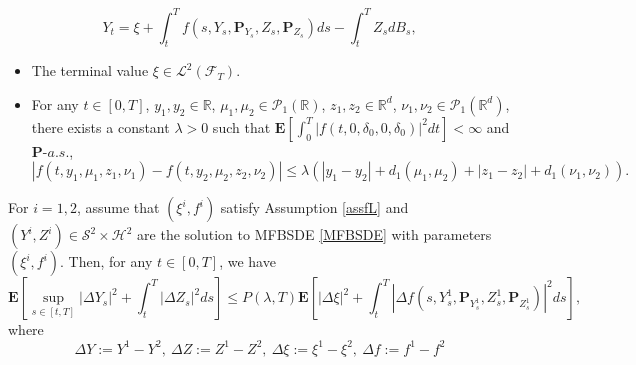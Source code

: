 \documentclass[10pt,a4paper]{amsart}
\def \E{\mathbf{E}}
\def \P{\mathbf{P}}
\begin{document}
\begin{equation}\label{MFBSDE}
Y_t=\xi+\int_t^T f(s,Y_s,\P_{Y_s},Z_s,\P_{Z_s})ds-\int_t^T Z_s dB_s,  
\end{equation}

\begin{assumption}\label{assfL}
\begin{itemize}
\item[(i)] The terminal value $\xi\in\mathcal{L}^2(\mathcal{F}_T)$.
\item[(ii)]  For any $t\in[0,T]$, $ y_1,y_2\in \mathbb{R}$, $\mu_1, \mu_2\in\mathcal{P}_{1}\left(\mathbb{R}\right)$,  $z_1,z_2\in \mathbb{R}^d$, $\nu_1,\nu_2\in\mathcal{P}_{1}\left(\mathbb{R}^d\right)$, there exists a constant $\lambda>0$ such that $\mathbf{E}\left[\int_{0}^{T}\left|f(t,0,\delta_0,0,\delta_0)\right|^2dt\right]<\infty$ and $\mathbf{P}$-$a.s.$, 
\begin{equation*}
 \left|f(t,y_1,\mu_1,z_1,\nu_1)-f(t,y_2,\mu_2,z_2,\nu_2)\right|
 \leq \lambda\left(\left|y_1-y_2\right|+d_1\left(\mu_1,\mu_2\right)+\left|z_1-z_2\right|+d_1\left(\nu_1,\nu_2\right)\right).
 \end{equation*}
\end{itemize}
\end{assumption}

\begin{theorem}\label{4-2}
 For $i=1,2$, assume that $(\xi^i,f^i)$ satisfy Assumption \ref{assfL} and $(Y^i,Z^i)\in\mathcal{S}^2\times\mathcal{H}^2$ are the solution to MFBSDE \eqref{MFBSDE} with parameters $(\xi^i,f^i)$. Then, for any $ t\in[0,T]$, we have
 \begin{equation*}
  \E\left[\sup_{s\in[t,T]}\left|\Delta Y_s\right|^2+\int_{t}^{T}\left|\Delta Z_s\right|^2 ds\right]\leq P(\lambda,T)\E\left[\left|\Delta\xi\right|^2+\int_{t}^{T}\left|\Delta f(s,Y_s^1,\P_{Y_s^1},Z_s^1,\P_{Z_s^1})\right|^2ds\right],       
 \end{equation*}
 where $$\Delta Y:=Y^1-Y^2,\ \Delta Z:=Z^1-Z^2,\ \Delta \xi:=\xi^1-\xi^2,\ \Delta f:=f^1-f^2$$
\end{theorem}
\end{document}
